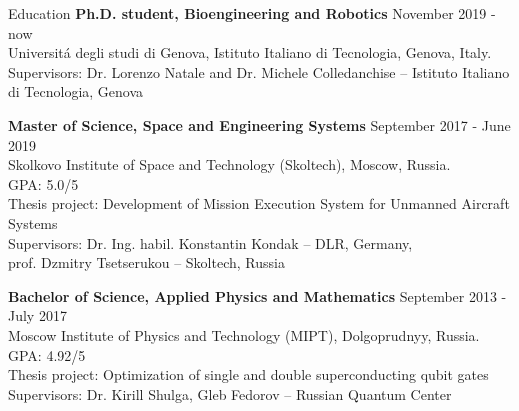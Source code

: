 \documentclass{resume} %
\begin{document}



\begin{rSection}{Education}
{\bf Ph.D. student, Bioengineering and Robotics} \hfill {November 2019 - now}
\\ 
Universit\'a degli studi di Genova, Istituto Italiano di Tecnologia, Genova, Italy.
\\
{Supervisors: Dr. Lorenzo Natale and Dr. Michele Colledanchise -- Istituto Italiano di Tecnologia, Genova}


{\bf Master of Science, Space and Engineering Systems} \hfill {September 2017 - June 2019}
\\ 
Skolkovo Institute of Space and Technology (Skoltech), Moscow, Russia.
\\
GPA: 5.0/5
\\
{Thesis project: Development of Mission Execution System for Unmanned Aircraft Systems}
\\
{Supervisors: Dr. Ing. habil. Konstantin Kondak -- DLR, Germany,\\} 
{prof. Dzmitry Tsetserukou -- Skoltech, Russia}

{\bf Bachelor of Science, Applied Physics and Mathematics} \hfill {September 2013 - July 2017}
\\ 
Moscow Institute of Physics and Technology (MIPT), Dolgoprudnyy, Russia.
\\
GPA: 4.92/5
\\
Thesis project: Optimization of single and double superconducting qubit gates 
\\
Supervisors: Dr. Kirill Shulga, Gleb Fedorov -- Russian Quantum Center



\end{rSection}
\end{document}
